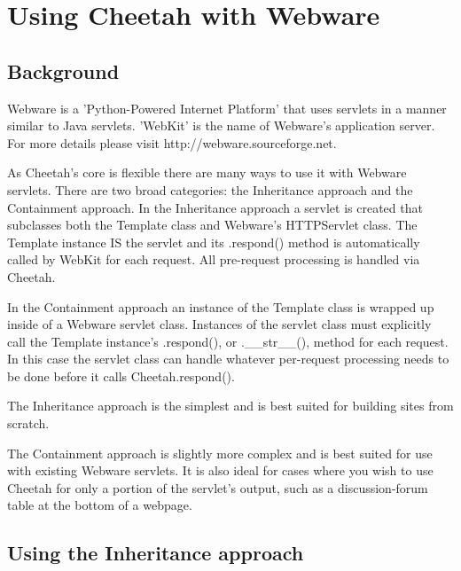 \section{Using Cheetah with Webware}
\label{webware}

\subsection{Background}
\label{webware.background}

Webware is a 'Python-Powered Internet Platform' that uses servlets in a manner
similar to Java servlets.  'WebKit' is the name of Webware's application server.
For more details please visit http://webware.sourceforge.net.

As Cheetah's core is flexible there are many ways to use it with Webware
servlets.  There are two broad categories: the Inheritance approach and
the Containment approach.  In the Inheritance approach a servlet is created that
subclasses both the Template class and Webware's HTTPServlet class.  The
Template instance IS the servlet and its .respond() method is
automatically called by WebKit for each request.  All pre-request processing is
handled via Cheetah.

In the Containment approach an instance of the Template class is wrapped
up inside of a Webware servlet class.  Instances of the servlet class must
explicitly call the Template instance's .respond(), or .__str__(), method
for each request.  In this case the servlet class can handle whatever
per-request processing needs to be done before it calls Cheetah.respond().

The Inheritance approach is the simplest and is best suited for building sites
from scratch.

The Containment approach is slightly more complex and is best suited for use
with existing Webware servlets.  It is also ideal for cases where you wish to
use Cheetah for only a portion of the servlet's output, such as a
discussion-forum table at the bottom of a webpage. 

\subsection{Using the Inheritance approach}
\label{webware.inheritance}

